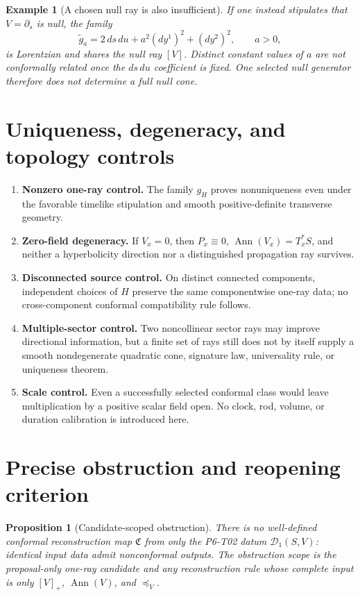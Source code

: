 \documentclass[11pt]{article}
\newtheorem{proposition}[theorem]{Proposition}
\newtheorem{example}[theorem]{Example}
\newcommand{\Ann}{\operatorname{Ann}}
\begin{document}
\begin{example}[A chosen null ray is also insufficient]
If one instead stipulates that \(V=\partial_s\) is null, the family
\[
   \widetilde g_a=2\,ds\,du+a^2(dy^1)^2+(dy^2)^2,\qquad a>0,
\]
is Lorentzian and shares the null ray \([V]\).  Distinct constant values of
\(a\) are not conformally related once the \(ds\,du\) coefficient is fixed.
One selected null generator therefore does not determine a full null cone.
\end{example}

\section{Uniqueness, degeneracy, and topology controls}

\begin{enumerate}
\item \textbf{Nonzero one-ray control.}  The family \(g_H\) proves
nonuniqueness even under the favorable timelike stipulation and smooth
positive-definite transverse geometry.
\item \textbf{Zero-field degeneracy.}  If \(V_x=0\), then
\(P_x\equiv0\), \(\Ann(V_x)=T_x^*S\), and neither a hyperbolicity direction nor
a distinguished propagation ray survives.
\item \textbf{Disconnected source control.}  On distinct connected
components, independent choices of \(H\) preserve the same componentwise
one-ray data; no cross-component conformal compatibility rule follows.
\item \textbf{Multiple-sector control.}  Two noncollinear sector rays may
improve directional information, but a finite set of rays still does not by
itself supply a smooth nondegenerate quadratic cone, signature law,
universality rule, or uniqueness theorem.
\item \textbf{Scale control.}  Even a successfully selected conformal class
would leave multiplication by a positive scalar field open.  No clock, rod,
volume, or duration calibration is introduced here.
\end{enumerate}

\section{Precise obstruction and reopening criterion}

\begin{proposition}[Candidate-scoped obstruction]
There is no well-defined conformal reconstruction map
\(\mathfrak C\) from only the P6-T02 datum \(\mathcal D_1(S,V)\): identical
input data admit nonconformal outputs.  The obstruction scope is the
proposal-only one-ray candidate and any reconstruction rule whose complete
input is only \([V]_+\), \(\Ann(V)\), and \(\preceq_V\).
\end{proposition}
\end{document}
